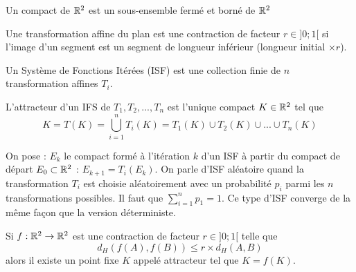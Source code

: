 
		\medskip

		\begin{definition}[Compact]
			\label{def-2-compact}
			Un compact de $\mathbb{R}^2$ est un sous-ensemble fermé et borné de $\mathbb{R}^2$
		\end{definition}

		\begin{definition}[Contraction]
			\label{def-2-contraction}
			Une transformation affine du plan est une contraction de facteur $r\in ]0;1[$ si l'image d'un segment est un segment de longueur inférieur (longueur initial $\times r$).
		\end{definition}

		\smallskip

		\begin{definition}
			\label{def-2-ifs}
			Un Système de Fonctions Itérées (ISF) est une collection finie de $n$ transformation affines $T_i$.
		\end{definition}

		\begin{definition}[Attracteur]
			\label{def-2-attracteur}
			 L’attracteur d’un IFS de ${T_1,T_2,...,T_n}$ est l’unique compact $K\in\mathbb{R}^2$ tel que
			 \begin{equation}
			 	\label{eq-2-attracteur}
			 	K = T(K) = \bigcup_{i=1}^n T_i(K) = T_1(K) \cup T_2(K) \cup ... \cup T_n(K)
			 \end{equation}
		\end{definition}

		\medskip

		On pose : $E_k$ le compact formé à l'itération $k$ d'un ISF à partir du compact de départ $E_0 \subset \mathbb{R}^2$ : $E_{k+1} = T_i(E_k)$.
		On parle d'ISF aléatoire quand la transformation $T_i$ est choisie aléatoirement avec un probabilité $p_i$ parmi les $n$ transformations possibles. Il faut que $\sum_{i=1}^n p_1 = 1$. Ce type d'ISF converge de la même façon que la version déterministe.

		\begin{theoreme}
			\label{th-2-convergenceISF}
			Si $f: \mathbb{R}^2\to\mathbb{R}^2$	est une contraction de facteur $r \in ]0;1[ $ telle que
			$$
				d_H(f(A),f(B)) \leq r \times d_H(A,B)
			$$
			alors il existe un point fixe $K$ appelé attracteur tel que $K=f(K)$.
		\end{theoreme}

